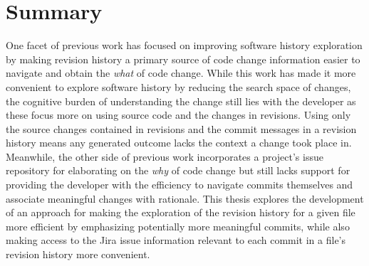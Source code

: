 \section{Summary}

One facet of previous work has focused on improving software history exploration by making revision history a primary source of code change information easier to navigate and obtain the \emph{what} of code change.
While this work has made it more convenient to explore software history by reducing the search space of changes, the cognitive burden of understanding the change still lies with the developer as these focus more on using source code and the changes in revisions.
Using only the source changes contained in revisions and the commit messages in a revision history means any generated outcome lacks the context a change took place in.
Meanwhile, the other side of previous work incorporates a project's issue repository for elaborating on the \emph{why} of code change but still lacks support for providing the developer with the efficiency to navigate commits themselves and associate meaningful changes with rationale.
This thesis explores the development of an approach for making the exploration of the revision history for a given file more efficient by emphasizing potentially more meaningful commits, while also making access to the Jira issue information relevant to each commit in a file's revision history more convenient.

\endinput

Any text after an \endinput is ignored.
You could put scraps here or things in progress.